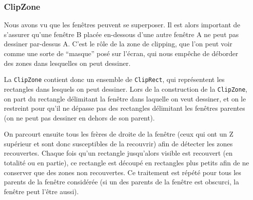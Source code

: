 \subsubsection{ClipZone}
\label{ClipZone}

Nous avons vu que les fenêtres peuvent se superposer. Il est alors important de s'assurer qu'une fenêtre B placée en-dessous d'une autre fenêtre A ne peut pas dessiner par-dessus A. C'est le rôle de la zone de clipping, que l'on peut voir comme une sorte de ``masque'' posé sur l'écran, qui nous empêche de déborder des zones dans lesquelles on peut dessiner.

La \verb|ClipZone| contient donc un ensemble de \verb|ClipRect|, qui représentent les rectangles dans lesquels on peut dessiner. Lors de la construction de la \verb|ClipZone|, on part du rectangle délimitant la fenêtre dans laquelle on veut dessiner, et on le restreint pour qu'il ne dépasse pas des rectangles délimitant les fenêtres parentes (on ne peut pas dessiner en dehors de son parent).

On parcourt ensuite tous les frères de droite de la fenêtre (ceux qui ont un Z supérieur et sont donc susceptibles de la recouvrir) afin de détecter les zones recouvertes. Chaque fois qu'un rectangle jusqu'alors visible est recouvert (en totalité ou en partie), ce rectangle est découpé en rectangles plus petits afin de ne conserver que des zones non recouvertes. Ce traitement est répété pour tous les parents de la fenêtre considérée (si un des parents de la fenêtre est obscurci, la fenêtre peut l'être aussi).

